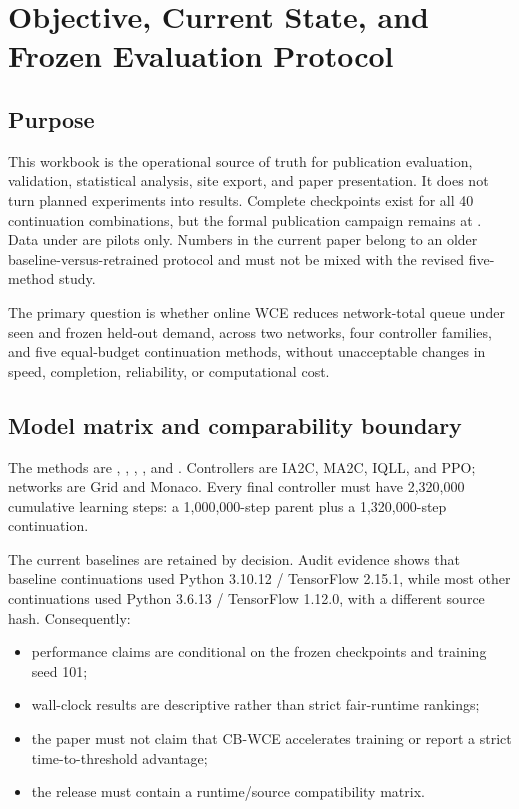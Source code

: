 \chapter{Objective, Current State, and Frozen Evaluation Protocol}

\section{Purpose}
This workbook is the operational source of truth for publication evaluation, validation, statistical analysis, site export, and paper presentation. It does not turn planned experiments into results. Complete checkpoints exist for all 40 continuation combinations, but the formal publication campaign remains at . Data under  are pilots only. Numbers in the current paper belong to an older baseline-versus-retrained protocol and must not be mixed with the revised five-method study.

The primary question is whether online WCE reduces network-total queue under seen and frozen held-out demand, across two networks, four controller families, and five equal-budget continuation methods, without unacceptable changes in speed, completion, reliability, or computational cost.

\section{Model matrix and comparability boundary}
The methods are , , , , and . Controllers are IA2C, MA2C, IQLL, and PPO; networks are Grid and Monaco. Every final controller must have 2,320,000 cumulative learning steps: a 1,000,000-step parent plus a 1,320,000-step continuation.

The current baselines are retained by decision. Audit evidence shows that baseline continuations used Python 3.10.12 / TensorFlow 2.15.1, while most other continuations used Python 3.6.13 / TensorFlow 1.12.0, with a different  source hash. Consequently:
\begin{itemize}
  \item performance claims are conditional on the frozen checkpoints and training seed 101;
  \item wall-clock results are descriptive rather than strict fair-runtime rankings;
  \item the paper must not claim that CB-WCE accelerates training or report a strict time-to-threshold advantage;
  \item the release must contain a runtime/source compatibility matrix.
\end{itemize}

